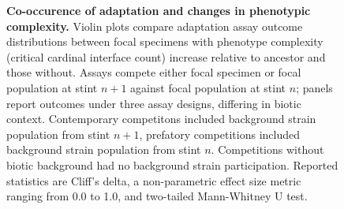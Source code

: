 \begin{figure}
\caption{
    \textbf{Co-occurence of adaptation and changes in phenotypic complexity.}
    \footnotesize
    Violin plots compare adaptation assay outcome distributions between focal specimens with phenotype complexity (critical cardinal interface count) increase relative to ancestor and those without.
    Assays compete either focal specimen or focal population at stint $n+1$ against focal population at stint $n$;
    panels report outcomes under three assay designs, differing in biotic context.
    Contemporary competitons included background strain population from stint $n+1$, prefatory competitions included background strain population from stint $n$.
    Competitions without biotic background had no background strain participation.
    Reported statistics are Cliff's delta, a non-parametric effect size metric ranging from 0.0 to 1.0, and two-tailed Mann-Whitney U test.
}
\label{fig:fitness-pcomplexity}

\end{figure}
